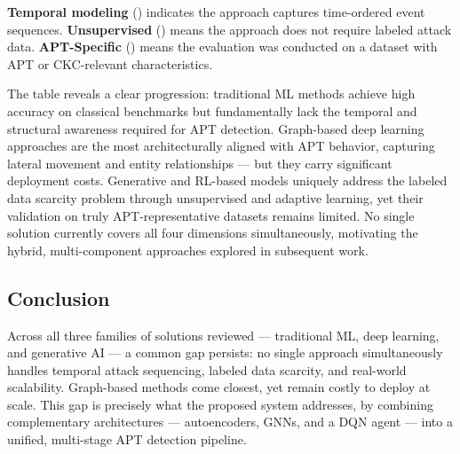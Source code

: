 \noindent \textbf{Temporal modeling} (\checkmark) indicates the approach captures time-ordered event sequences. \textbf{Unsupervised} (\checkmark) means the approach does not require labeled attack data. \textbf{APT-Specific} (\checkmark) means the evaluation was conducted on a dataset with APT or CKC-relevant characteristics.

The table reveals a clear progression: traditional ML methods achieve high accuracy on classical benchmarks but fundamentally lack the temporal and structural awareness required for APT detection. Graph-based deep learning approaches are the most architecturally aligned with APT behavior, capturing lateral movement and entity relationships --- but they carry significant deployment costs. Generative and RL-based models uniquely address the labeled data scarcity problem through unsupervised and adaptive learning, yet their validation on truly APT-representative datasets remains limited. No single solution currently covers all four dimensions simultaneously, motivating the hybrid, multi-component approaches explored in subsequent work.

\subsection{Conclusion}
Across all three families of solutions reviewed --- traditional ML, deep learning, and
generative AI --- a common gap persists: no single approach simultaneously handles
temporal attack sequencing, labeled data scarcity, and real-world scalability.
Graph-based methods come closest, yet remain costly to deploy at scale. This gap is
precisely what the proposed system addresses, by combining complementary architectures
--- autoencoders, GNNs, and a DQN agent --- into a unified, multi-stage APT detection
pipeline.


